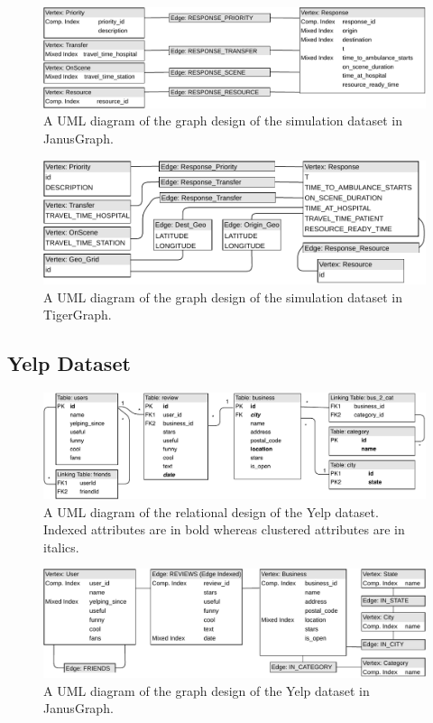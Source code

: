 \begin{figure}[htp]
    \centering
    \includegraphics[width=16cm]{img/schema/simJanus.pdf}
    \caption{A UML diagram of the graph design of the simulation dataset in JanusGraph.}
    \label{fig:simJanusgraphDesign}
\end{figure}

\begin{figure}[htp]
    \centering
    \includegraphics[width=16cm]{img/schema/simTiger.pdf}
    \caption{A UML diagram of the graph design of the simulation dataset in TigerGraph.}
    \label{fig:simTigergraphDesign}
\end{figure}

\newpage
\subsection{Yelp Dataset}
\begin{figure}[htp]
    \centering
    \includegraphics[width=16cm]{img/schema/yelpRelational.pdf}
    \caption{A UML diagram of the relational design of the Yelp dataset. Indexed attributes are in bold whereas clustered attributes are in italics.}
    \label{fig:yelpRelationalDesign}
\end{figure}

\begin{figure}[htp]
    \centering
    \includegraphics[width=16cm]{img/schema/yelpJanus.pdf}
    \caption{A UML diagram of the graph design of the Yelp dataset in JanusGraph.}
    \label{fig:yelpJanusgraphDesign}
\end{figure}

